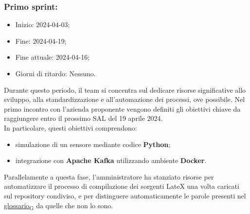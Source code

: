     \subsubsection{Primo sprint:}
        \begin{itemize}
            \item Inizio: 2024-04-03;
            \item Fine: 2024-04-19;
            \item Fine attuale: 2024-04-16;
            \item Giorni di ritardo: Nessuno.
        \end{itemize}
        Durante questo periodo, il team si concentra sul dedicare risorse significative allo sviluppo, alla standardizzazione e all'automazione dei processi, ove possibile. Nel primo incontro con l'azienda proponente vengono definiti gli obiettivi chiave da raggiungere entro il prossimo SAL del 19 aprile 2024. \\In particolare, questi obiettivi comprendono:
        \begin{itemize}
            \item simulazione di un sensore mediante codice \textbf{Python};
            \item integrazione con \textbf{Apache Kafka} utilizzando ambiente \textbf{Docker}.
        \end{itemize}
        Parallelamente a questa fase, l'amministratore ha stanziato risorse per automatizzare il processo di compilazione dei sorgenti LateX una volta caricati sul repository condiviso, e per distinguere automaticamente le parole presenti nel \href{https://7last.github.io/docs/rtb/documentazione-interna/glossario#glossario}{glossario\textsubscript{G}} da quelle che non lo sono.

